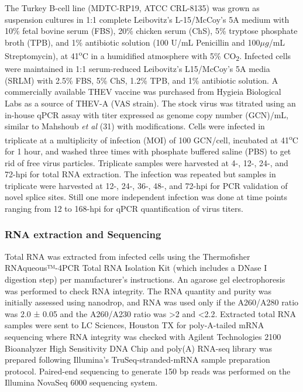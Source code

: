 \documentclass[
]{article}
\begin{document}
The Turkey B-cell line (MDTC-RP19, ATCC CRL-8135) was grown as
suspension cultures in 1:1 complete Leibovitz's L-15/McCoy's 5A medium
with 10\% fetal bovine serum (FBS), 20\% chicken serum (ChS), 5\%
tryptose phosphate broth (TPB), and 1\% antibiotic solution (100 U/mL
Penicillin and 100\(\mu g\)/mL Streptomycin), at 41\textsuperscript{o}C
in a humidified atmosphere with 5\% CO\textsubscript{2}. Infected cells
were maintained in 1:1 serum-reduced Leibovitz's L15/McCoy's 5A media
(SRLM) with 2.5\% FBS, 5\% ChS, 1.2\% TPB, and 1\% antibiotic solution.
A commercially available THEV vaccine was purchased from Hygieia
Biological Labs as a source of THEV-A (VAS strain). The stock virus was
titrated using an in-house qPCR assay with titer expressed as genome
copy number (GCN)/mL, similar to Mahshoub \emph{et al} (31) with
modifications. Cells were infected in triplicate at a multiplicity of
infection (MOI) of 100 GCN/cell, incubated at 41\textsuperscript{o}C for
1 hour, and washed three times with phosphate buffered saline (PBS) to
get rid of free virus particles. Triplicate samples were harvested at
4-, 12-, 24-, and 72-hpi for total RNA extraction. The infection was
repeated but samples in triplicate were harvested at 12-, 24-, 36-, 48-,
and 72-hpi for PCR validation of novel splice sites. Still one more
independent infection was done at time points ranging from 12 to 168-hpi
for qPCR quantification of virus titers.

\subsubsection{RNA extraction and
Sequencing}\label{rna-extraction-and-sequencing}

Total RNA was extracted from infected cells using the Thermofisher
RNAqueous™-4PCR Total RNA Isolation Kit (which includes a DNase I
digestion step) per manufacturer's instructions. An agarose gel
electrophoresis was performed to check RNA integrity. The RNA quantity
and purity was initially assessed using nanodrop, and RNA was used only
if the A260/A280 ratio was 2.0 ± 0.05 and the A260/A230 ratio was
\textgreater2 and \textless2.2. Extracted total RNA samples were sent to
LC Sciences, Houston TX for poly-A-tailed mRNA sequencing where RNA
integrity was checked with Agilent Technologies 2100 Bioanalyzer High
Sensitivity DNA Chip and poly(A) RNA-seq library was prepared following
Illumina's TruSeq-stranded-mRNA sample preparation protocol. Paired-end
sequencing to generate 150 bp reads was performed on the Illumina
NovaSeq 6000 sequencing system.
\end{document}
